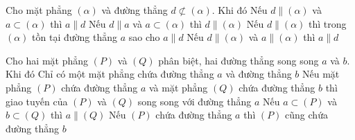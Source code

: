 
\begin{ex}%
 Cho mặt phẳng $\left(  \alpha \right)$ và đường thẳng $d\not\subset\left( \alpha \right)$. Khi đó
  \choiceTF
  {Nếu $d\parallel \left(  \alpha \right)$ và $a\subset \left( \alpha \right)$ thì $a\parallel d$}
  {\True Nếu  $d\parallel a$ và $a\subset \left( \alpha \right)$ thì $d\parallel \left( \alpha \right)$}
  {\True Nếu $d\parallel \left( \alpha \right)$ thì trong $\left( \alpha \right)$ tồn tại đường thẳng $a$ sao cho  $a\parallel d$ }
  {Nếu  $d\parallel \left( \alpha \right)$ và $a\parallel \left( \alpha \right)$ thì $a\parallel d$ }
\end{ex}

\begin{ex}%
 Cho hai mặt phẳng $(P)$ và $(Q)$ phân biệt, hai đường thẳng  song song $a$ và $b$. Khi đó
  \choiceTF
  {\True Chỉ có một mặt phẳng chứa  đường thẳng $a$ và đường thẳng $b$}
  {\True Nếu mặt phẳng $(P)$ chứa đường thẳng $a$ và mặt phẳng $(Q)$ chứa  đường thẳng $b$ thì giao tuyến của $(P)$ và $(Q)$ song song với đường thẳng $a$}
  {\True Nếu $a\subset(P)$ và  $b\subset (Q)$ thì $a\parallel(Q)$}
  {Nếu $(P)$ chứa đường thẳng  $a$ thì $(P)$ cũng chứa đường thẳng $b$}
\end{ex}

